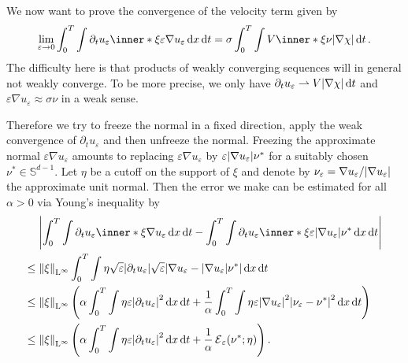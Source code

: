 We now want to prove the convergence of the velocity term given by
\begin{equation*}
	\lim_{ \varepsilon \to 0 }
	\int_{ 0 }^{ T }
	\int
	\partial_{ t } u_{ \varepsilon }
	\inner*{ \xi }{ \varepsilon \nabla u_{ \varepsilon } }
	\dd{ x }
	\dd{ t }
	=
	\sigma
	\int_{ 0 }^{ T }
	\int
	V \inner*{ \xi }{ \nu }
	\abs{ \nabla \chi }
	\dd{ t }.
\end{equation*}
The difficulty here is that products of weakly converging sequences will in 
general not weakly converge. To be more precise, we only have $ \partial_{ t } 
u_{ \varepsilon } \rightharpoonup V \abs{ \nabla \chi } \dd{ t } $ and 
$ \varepsilon \nabla u_{ \varepsilon } \approx \sigma \nu $ in a 
weak sense. 

Therefore we try to freeze the normal in a fixed direction, apply the weak 
convergence of $ \partial_{ t } u_{ \varepsilon } $ and then unfreeze the 
normal. Freezing the approximate normal $ \varepsilon \nabla u_{ \varepsilon } 
$ amounts to replacing $ \varepsilon \nabla u_{ 
\varepsilon } $ by $ 
\varepsilon \abs{ \nabla u_{ \varepsilon } } \nu^{ \ast } $ for a suitably 
chosen $ \nu^{ \ast } \in \mathbb{ S }^{ d-1 } $. Let $ \eta $ be a cutoff on 
the support of $ \xi $ and denote by $ \nu_{ \varepsilon } = \nabla u_{ 
\varepsilon } / \abs{ \nabla u_{ \varepsilon } } $ the approximate unit normal. 
Then the error we make can be estimated for all $ 
\alpha > 0 $ via Young's inequality by
\begin{align}
	\notag
	&\abs{
		\int_{ 0 }^{ T }
		\int
		\partial_{ t } u_{ \varepsilon }
		\inner*{ \xi }{ \nabla u_{ \varepsilon } }
		\dd{ x }
		\dd{ t }
		-
		\int_{ 0 }^{ T }
		\int
		\partial_{ t } u_{ \varepsilon }
		\inner*{ \xi }{ \varepsilon \abs{ \nabla u_{ \varepsilon } } \nu^{ \ast 
		} }
		\dd{ x }
		\dd{ t }
	}
	\\
	\notag
	\leq {} &
	\norm{ \xi }_{ \lp^{ \infty } }
	\int_{ 0 }^{ T }
	\int
	\eta
	\sqrt{ \varepsilon }
	\abs{ \partial_{  t } u_{ \varepsilon } }
	\sqrt{  \varepsilon } 
	\abs{
		\nabla u_{ \varepsilon }
		-
		\abs{ \nabla u_{ \varepsilon } }
		\nu^{ \ast }
	}
	\dd{ x } 
	\dd{ t }
	\\
	\notag
	\leq {} &
	\norm{ \xi }_{ \lp^{ \infty } }
	\left(
	\alpha 
	\int_{ 0 }^{ T }
	\int
	\eta
	\varepsilon \abs{ \partial_{ t } u_{ \varepsilon } }^{ 2 }
	\dd{ x }
	\dd{ t }
	+
	\frac{ 1 }{ \alpha }
	\int_{ 0 }^{ T }
	\int
	\eta
	\varepsilon
	\abs{ \nabla u_{ \varepsilon } }^{ 2 }
	\abs{
		\nu_{ \varepsilon } - \nu^{ \ast } 
	}^{ 2 } 
	\dd{ x }
	\dd{ t }
	\right)
	\\
	\label{acceptable_error_term_velocity_twophase}
	\leq{}
	&
	\norm{ \xi }_{ \lp^{ \infty } }
	\left( 
	\alpha 	
	\int_{ 0 }^{ T }
	\int
	\eta
	\varepsilon \abs{ \partial_{ t } u_{ \varepsilon } }^{ 2 }
	\dd{ x }
	\dd{ t }
	+ 
	\frac{ 1 }{ \alpha }
	\tilt_excess_{ \varepsilon } ( \nu^{ \ast } ; \eta ) 
	\right).
\end{align}
